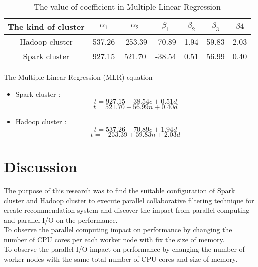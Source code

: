 \documentclass[conference]{IEEEtran}
\begin{document}
\begin{table}[h]
\centering
\caption{The value of coefficient in Multiple Linear Regression}
\label{my-label}
\begin{tabular}{|c|c|c|c|c|c|c|}
\hline
The kind of cluster & \begin{math}\alpha_{1}\end{math} & \begin{math}\alpha_{2}\end{math} & \begin{math}\beta_{1}\end{math} & \begin{math}\beta_{2}\end{math} & \begin{math}\beta_{3}\end{math} & \begin{math}\beta{4}\end{math} \\ \hline
Hadoop cluster & 537.26 & -253.39 & -70.89 & 1.94 & 59.83 & 2.03 \\ \hline
Spark cluster & 927.15 & 521.70 & -38.54 & 0.51 & 56.99 & 0.40 \\ \hline
\end{tabular}
\end{table}
The Multiple Linear Regression (MLR) equation

\begin{itemize}
\item{Spark cluster : }
\begin{equation} \tag{3.1}
	t = 927.15 - 38.54c + 0.51d
\end{equation}
\begin{equation} \tag{4.1}
	t = 521.70 + 56.99n + 0.40d 
\end{equation}
\item{Hadoop cluster : }
\begin{equation} \tag{3.2}
	t = 537.26 - 70.89c + 1.94d
\end{equation}
\begin{equation} \tag{4.2}
	t = -253.39 + 59.83n + 2.03d 
\end{equation}
\end{itemize}

\section{Discussion}
The purpose of this research was to find the suitable configuration of Spark cluster and Hadoop cluster to execute parallel collaborative filtering technique for create recommendation system and discover the impact from parallel computing and parallel I/O on the performance.\\
\indent To observe the parallel computing impact on performance by changing the number of CPU cores per each worker node with fix the size of memory.\\
\indent To observe the parallel I/O impact on performance by changing the number of worker nodes with the same total number of CPU cores and size of memory.
\end{document}
